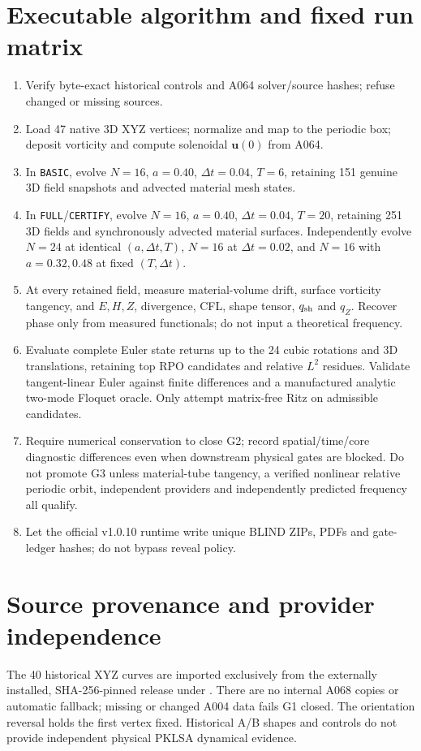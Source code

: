 \documentclass[11pt,a4paper]{article}
\begin{document}
\section{Executable algorithm and fixed run matrix}
\begin{enumerate}
\item Verify byte-exact historical controls and A064 solver/source hashes; refuse changed or missing sources.
\item Load 47 native 3D XYZ vertices; normalize and map to the periodic box; deposit vorticity and compute solenoidal $\mathbf u(0)$ from A064.
\item In \texttt{BASIC}, evolve $N=16$, $a=0.40$, $\Delta t=0.04$, $T=6$, retaining 151 genuine 3D field snapshots and advected material mesh states.
\item In \texttt{FULL}/\texttt{CERTIFY}, evolve $N=16$, $a=0.40$, $\Delta t=0.04$, $T=20$, retaining 251 3D fields and synchronously advected material surfaces. Independently evolve $N=24$ at identical $(a,\Delta t,T)$, $N=16$ at $\Delta t=0.02$, and $N=16$ with $a=0.32,0.48$ at fixed $(T,\Delta t)$.
\item At every retained field, measure material-volume drift, surface vorticity tangency, and $E,H,Z$, divergence, CFL, shape tensor, $q_{\rm sh}$ and $q_Z$. Recover phase only from measured functionals; do not input a theoretical frequency.
\item Evaluate complete Euler state returns up to the 24 cubic rotations and 3D translations, retaining top RPO candidates and relative $L^2$ residues. Validate tangent-linear Euler against finite differences and a manufactured analytic two-mode Floquet oracle. Only attempt matrix-free Ritz on admissible candidates.\item Require numerical conservation to close G2; record spatial/time/core diagnostic differences even when downstream physical gates are blocked. Do not promote G3 unless material-tube tangency, a verified nonlinear relative periodic orbit, independent providers and independently predicted frequency all qualify.
\item Let the official v1.0.10 runtime write unique BLIND ZIPs, PDFs and gate-ledger hashes; do not bypass reveal policy.\end{enumerate}

\section{Source provenance and provider independence}
\noindent The 40 historical XYZ curves are imported exclusively from the externally installed, SHA-256-pinned  release under . There are no internal A068 copies or automatic fallback; missing or changed A004 data fails G1 closed. The orientation reversal holds the first vertex fixed. Historical A/B shapes and controls do not provide independent physical PKLSA dynamical evidence.\par
\end{document}
